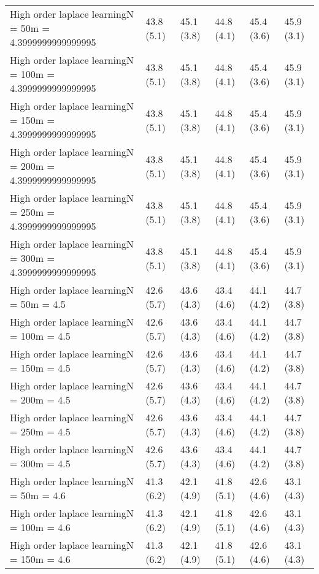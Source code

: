 \documentclass{article}
\begin{document}
\begin{table*}[t!]
\begin{center}
\begin{small}
\begin{sc}
\begin{tabular}{llllll}
High order laplace learningN = 50m = 4.3999999999999995&43.8 (5.1)      &45.1 (3.8)      &44.8 (4.1)      &45.4 (3.6)      &45.9 (3.1)      \\
High order laplace learningN = 100m = 4.3999999999999995&43.8 (5.1)      &45.1 (3.8)      &44.8 (4.1)      &45.4 (3.6)      &45.9 (3.1)      \\
High order laplace learningN = 150m = 4.3999999999999995&43.8 (5.1)      &45.1 (3.8)      &44.8 (4.1)      &45.4 (3.6)      &45.9 (3.1)      \\
High order laplace learningN = 200m = 4.3999999999999995&43.8 (5.1)      &45.1 (3.8)      &44.8 (4.1)      &45.4 (3.6)      &45.9 (3.1)      \\
High order laplace learningN = 250m = 4.3999999999999995&43.8 (5.1)      &45.1 (3.8)      &44.8 (4.1)      &45.4 (3.6)      &45.9 (3.1)      \\
High order laplace learningN = 300m = 4.3999999999999995&43.8 (5.1)      &45.1 (3.8)      &44.8 (4.1)      &45.4 (3.6)      &45.9 (3.1)      \\
High order laplace learningN = 50m = 4.5&42.6 (5.7)      &43.6 (4.3)      &43.4 (4.6)      &44.1 (4.2)      &44.7 (3.8)      \\
High order laplace learningN = 100m = 4.5&42.6 (5.7)      &43.6 (4.3)      &43.4 (4.6)      &44.1 (4.2)      &44.7 (3.8)      \\
High order laplace learningN = 150m = 4.5&42.6 (5.7)      &43.6 (4.3)      &43.4 (4.6)      &44.1 (4.2)      &44.7 (3.8)      \\
High order laplace learningN = 200m = 4.5&42.6 (5.7)      &43.6 (4.3)      &43.4 (4.6)      &44.1 (4.2)      &44.7 (3.8)      \\
High order laplace learningN = 250m = 4.5&42.6 (5.7)      &43.6 (4.3)      &43.4 (4.6)      &44.1 (4.2)      &44.7 (3.8)      \\
High order laplace learningN = 300m = 4.5&42.6 (5.7)      &43.6 (4.3)      &43.4 (4.6)      &44.1 (4.2)      &44.7 (3.8)      \\
High order laplace learningN = 50m = 4.6&41.3 (6.2)      &42.1 (4.9)      &41.8 (5.1)      &42.6 (4.6)      &43.1 (4.3)      \\
High order laplace learningN = 100m = 4.6&41.3 (6.2)      &42.1 (4.9)      &41.8 (5.1)      &42.6 (4.6)      &43.1 (4.3)      \\
High order laplace learningN = 150m = 4.6&41.3 (6.2)      &42.1 (4.9)      &41.8 (5.1)      &42.6 (4.6)      &43.1 (4.3)      \\

\end{tabular}
\end{sc}
\end{small}
\end{center}
\end{table*}
\end{document}
